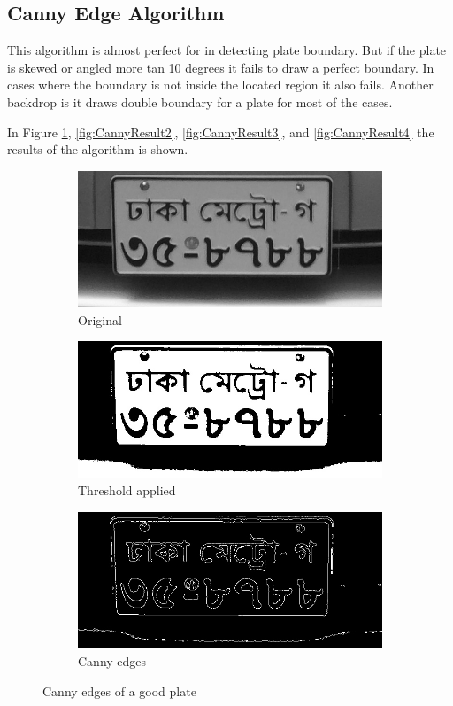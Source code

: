 \subsection{Canny Edge Algorithm}
This algorithm is almost perfect for in detecting plate boundary. But if the plate is skewed or angled more tan 10 degrees it fails to draw a perfect boundary. In cases where the boundary is not inside the located region it also fails. Another backdrop is it draws double boundary for a plate for most of the cases. 

In Figure \ref{fig:CannyResult1}, \ref{fig:CannyResult2}, \ref{fig:CannyResult3}, and \ref{fig:CannyResult4} the results of the algorithm is shown.



\begin{figure}
\begin{subfigure}{0.33\textwidth}
    \centering
    \includegraphics[width=0.9\linewidth]{./img/experiment/stage.9/00-good}
    \caption{Original}
\end{subfigure}
\begin{subfigure}{0.33\textwidth}
    \centering
    \includegraphics[width=0.9\linewidth]{./img/experiment/stage.10/00-good}
    \caption{Threshold applied}
\end{subfigure}
\begin{subfigure}{0.33\textwidth}
    \centering
    \includegraphics[width=0.9\linewidth]{./img/experiment/stage.11/00-good}
    \caption{Canny edges}
\end{subfigure}
\caption{Canny edges of a good plate}
\label{fig:CannyResult1}
\end{figure}



